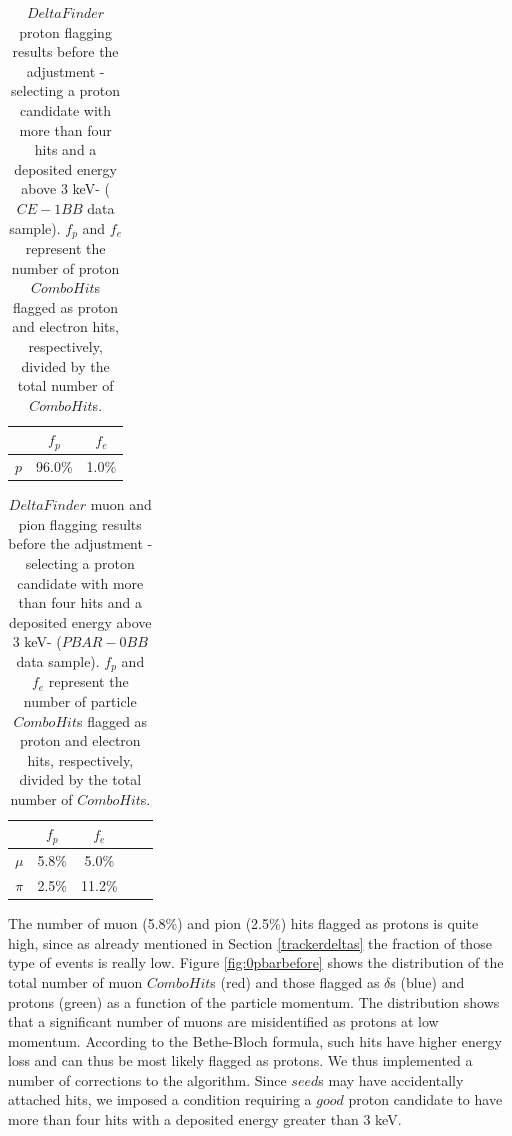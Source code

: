 \begin{center}
    \begin{table}[h!]
    \centering
    \renewcommand{\arraystretch}{1.}
    \begin{tabular}{| c | c | c |} 
    \hline
    & $f_{p}$ & $f_{e}$ \\
    \hline
    $p$     & 96.0\% & 1.0\% \\
    \hline
    \end{tabular}
    \caption{$DeltaFinder$ proton 
    flagging results before the 
    adjustment -selecting a proton 
    candidate with more than four hits 
    and a deposited energy above 3 keV- ($CE-1BB$ data sample). 
    $f_p$ and $f_e$ represent 
    the number of proton $ComboHit$s 
    flagged as proton and electron hits, respectively, 
    divided by the total number of $ComboHit$s.}
    \label{tab:1bbcelebefore}
    \end{table}
\end{center}
    
\begin{center}
    \begin{table}[h!]
        \centering
        \renewcommand{\arraystretch}{1.}
        \begin{tabular}{| c | c | c | c | c|} 
        \hline
        &   $f_{p}$ &   $f_{e}$\\
        \hline
        $\mu$ &  5.8\%  & 5.0\%\\
        \hline
        $\pi$ & 2.5\% &  11.2\%\\
        \hline
        \end{tabular}
        \caption{
            $DeltaFinder$ muon 
        and pion flagging results before the 
        adjustment -selecting a proton 
        candidate with more than four hits 
        and a deposited energy above 3 keV- 
        ($PBAR-0BB$ data sample). $f_p$ and 
        $f_e$ represent 
        the number of particle $ComboHit$s 
        flagged as proton and electron hits, respectively, 
        divided by the total number of $ComboHit$s.}
        \label{tab:0bbpbarbefore}
    \end{table}
\end{center}

The number of muon (5.8\%) and pion (2.5\%) hits flagged as protons is quite high,
since as already mentioned in Section \ref{trackerdeltas} the fraction 
of those type of events is really low. 
Figure \ref{fig:0pbarbefore} shows the  
distribution of the total 
number of muon $ComboHit$s (red) 
and those flagged as $\delta$s (blue) 
and protons (green) as a function 
of the particle momentum. 
The distribution shows that a significant number of 
muons are misidentified 
as protons at low momentum. 
According to the Bethe-Bloch formula, 
such hits have 
higher energy loss and can thus be 
most likely flagged as 
protons. We thus implemented a 
number of corrections to the algorithm. 
Since $seed$s may have 
accidentally attached hits, we imposed a 
condition requiring a $good$ proton 
candidate to have more than four 
hits with a deposited energy greater than 3 keV.

